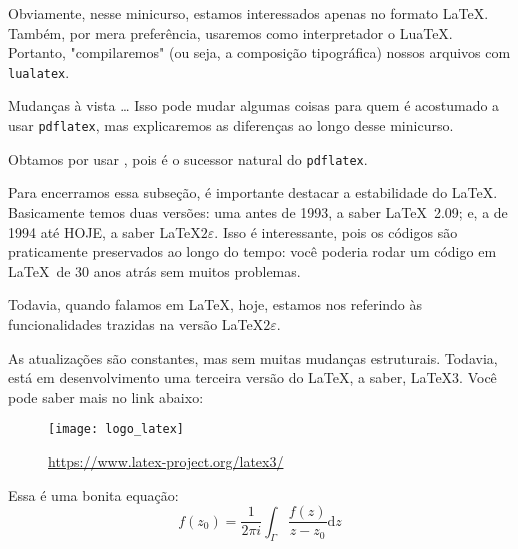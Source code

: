 Obviamente, nesse minicurso, estamos interessados apenas no formato \LaTeX.
Também, por mera preferência, usaremos como interpretador o Lua\TeX.
Portanto, "compilaremos" (ou seja, a composição tipográfica) nossos arquivos 
com \texttt{lualatex}.

\begin{atencao}{Mudanças à vista \ldots}{\exclamacao}
  Isso pode mudar algumas coisas para quem é acostumado a usar \texttt{pdflatex}, 
  mas explicaremos as diferenças ao longo desse minicurso.  
\end{atencao}

Obtamos por usar \lualatex, pois é o sucessor natural do \texttt{pdflatex}. 

Para encerramos essa subseção, é importante destacar a estabilidade do \LaTeX.
Basicamente temos duas versões: uma antes de 1993, a saber \LaTeX~2.09; e,
a de 1994 até HOJE, a saber \LaTeX$2\varepsilon$.
Isso é interessante, pois os códigos são praticamente preservados ao longo do 
tempo: você poderia rodar um código em \LaTeX\ de 30 anos atrás sem muitos 
problemas.

Todavia, quando falamos em \LaTeX{}, hoje, estamos nos referindo às 
funcionalidades trazidas na versão \LaTeX$2\varepsilon$.

As atualizações são constantes, mas sem muitas mudanças estruturais.
Todavia, está em desenvolvimento uma terceira versão do \LaTeX, a saber, \LaTeX3.
Você pode saber mais no link abaixo:

\begin{figure}[!htbp]
  \centering
  \texttt{[image: logo\_latex]}
  \caption{\href{https://www.latex-project.org/latex3/}{\textcolor{azulUFRB}{https://www.latex-project.org/latex3/}}}
\end{figure}


\begin{codeLaTeX}
Essa é uma bonita equação:
\[
  f(z_0) = \frac{1}{2 \pi i} \int_{\Gamma} \frac{f(z)}{z - z_0} \mathrm{d}z  
\]
\end{codeLaTeX}